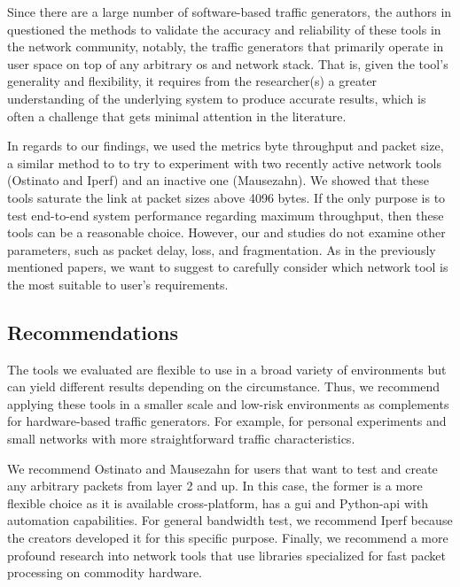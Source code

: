 \skippara Since there are a large number of software-based traffic generators, the authors in \cite{botta2010you, molnar2013validate} questioned the methods to validate the accuracy and reliability of these tools in the network community,
notably, the traffic generators that primarily operate in user space on top of any arbitrary \acrshort{os} and network stack.
That is, given the tool's generality and flexibility, it requires from the researcher(s) a greater understanding of the underlying system to produce accurate results, which is often a challenge that gets minimal attention in the literature.

\skippara In regards to our findings, we used the metrics byte throughput and packet size, a similar method to \cite{kolahi2011performance, srivastava2014evaluation, srivastava2014comparative} to try to experiment with two recently active network tools (Ostinato and Iperf) and an inactive one (Mausezahn).
We showed that these tools saturate the link at packet sizes above 4096 bytes.
If the only purpose is to test end-to-end system performance regarding maximum throughput, then these tools can be a reasonable choice.
However, our and \cite{kolahi2011performance, srivastava2014evaluation, srivastava2014comparative} studies do not examine other parameters, such as packet delay, loss, and fragmentation.
As in the previously mentioned papers, we want to suggest to carefully consider which network tool is the most suitable to user's requirements.

\clearpage
\subsection{Recommendations}

The tools we evaluated are flexible to use in a broad variety of environments but can yield different results depending on the circumstance.
Thus, we recommend applying these tools in a smaller scale and low-risk environments as complements for hardware-based traffic generators.
For example, for personal experiments and small networks with more straightforward traffic characteristics.

\skippara We recommend Ostinato and Mausezahn for users that want to test and create any arbitrary packets from layer 2 and up.
In this case, the former is a more flexible choice as it is available cross-platform, has a \acrshort{gui} and Python-\acrshort{api} with automation capabilities.
For general bandwidth test, we recommend Iperf because the creators developed it for this specific purpose.
Finally, we recommend a more profound research into network tools that use libraries specialized for fast packet processing on commodity hardware.
